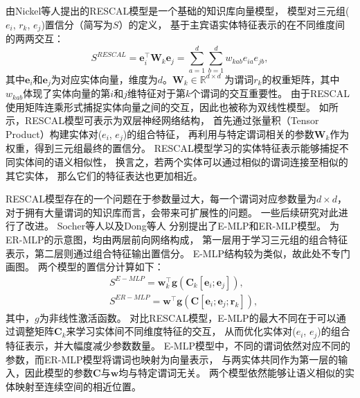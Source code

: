由Nickel等人提出的RESCAL模型\cite{nickel2012factorizing}是一个基础的知识库向量模型，
模型对三元组($e_i$, $r_k$, $e_j$)置信分（简写为$S$）的定义，
基于主宾语实体特征表示的在不同维度间的两两交互：
\begin{equation}
S^{RESCAL} = \bm{e}_i^\top \bm{W}_k \bm{e}_j = \sum_{a=1}^d \sum_{b=1}^d w_{kab} e_{ia} e_{jb},
\end{equation}
\noindent
其中$\bm{e}_i$和$\bm{e}_j$为对应实体向量，维度为$d$。$\bm{W}_k \in \mathbb{R}^{d \times d}$
为谓词$r_k$的权重矩阵，其中$w_{kab}$体现了实体向量的第$i$和$j$维特征对于第$k$个谓词的交互重要性。
由于RESCAL使用矩阵连乘形式捕捉实体向量之间的交互，因此也被称为双线性模型。
如所示，RESCAL模型可表示为双层神经网络结构，
首先通过张量积（Tensor Product）构建实体对($e_i$, $e_j$)的组合特征，
再利用与特定谓词相关的参数$\bm{W}_k$作为权重，得到三元组最终的置信分。
RESCAL模型学习的实体特征表示能够捕捉不同实体间的语义相似性，
换言之，若两个实体可以通过相似的谓词连接至相似的其它实体，
那么它们的特征表达也更加相近。



RESCAL模型存在的一个问题在于参数量过大，每一个谓词对应参数量为$d \times d$，
对于拥有大量谓词的知识库而言，会带来可扩展性的问题。
一些后续研究对此进行了改进。
Socher等人以及Dong等人
分别提出了E-MLP\cite{socher2013reasoning}和ER-MLP模型\cite{dong2014knowledge}。
为ER-MLP的示意图，均由两层前向网络构成，
第一层用于学习三元组的组合特征表示，第二层则通过组合特征输出置信分。
E-MLP结构较为类似，故此处不专门画图。
两个模型的置信分计算如下：
\begin{equation}
\begin{aligned}
& S^{E-MLP} = \bm{w}_k^\top \bm{g}(\bm{C}_k [\bm{e}_i; \bm{e}_j]), \\
& S^{ER-MLP} = \bm{w}^\top \bm{g}(\bm{C} [\bm{e}_i; \bm{e}_j; \bm{r}_k]),
\end{aligned}
\end{equation}
\noindent
其中，$g$为非线性激活函数。
对比RESCAL模型，E-MLP的最大不同在于可以通过调整矩阵$\bm{C}_k$来学习实体间不同维度特征的交互，
从而优化实体对($e_i$, $e_j$)的组合特征表示，并大幅度减少参数数量。
E-MLP模型中，不同的谓词依然对应不同的参数，而ER-MLP模型将谓词也映射为向量表示，
与两实体共同作为第一层的输入，因此模型的参数$\bm{C}$与$\bm{w}$均与特定谓词无关。
两个模型依然能够让语义相似的实体映射至连续空间的相近位置。

